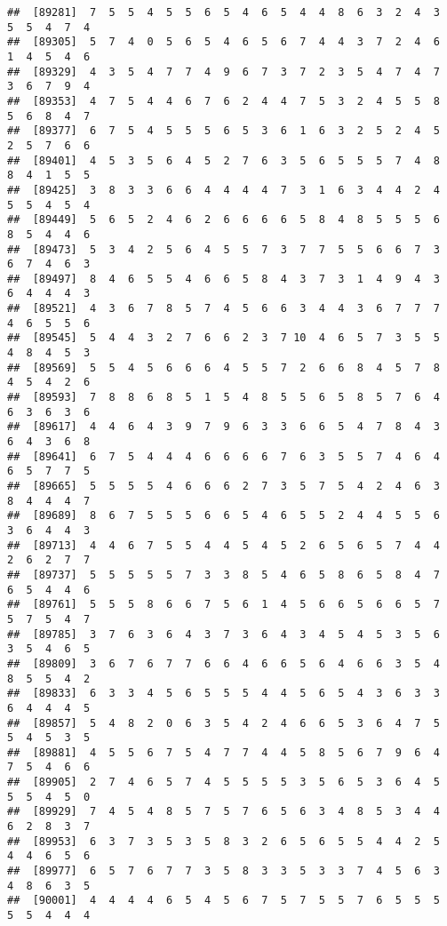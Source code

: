 \documentclass[
]{book}
\begin{document}
\begin{verbatim}
##  [89281]  7  5  5  4  5  5  6  5  4  6  5  4  4  8  6  3  2  4  3  5  5  4  7  4
##  [89305]  5  7  4  0  5  6  5  4  6  5  6  7  4  4  3  7  2  4  6  1  4  5  4  6
##  [89329]  4  3  5  4  7  7  4  9  6  7  3  7  2  3  5  4  7  4  7  3  6  7  9  4
##  [89353]  4  7  5  4  4  6  7  6  2  4  4  7  5  3  2  4  5  5  8  5  6  8  4  7
##  [89377]  6  7  5  4  5  5  5  6  5  3  6  1  6  3  2  5  2  4  5  2  5  7  6  6
##  [89401]  4  5  3  5  6  4  5  2  7  6  3  5  6  5  5  5  7  4  8  8  4  1  5  5
##  [89425]  3  8  3  3  6  6  4  4  4  4  7  3  1  6  3  4  4  2  4  5  5  4  5  4
##  [89449]  5  6  5  2  4  6  2  6  6  6  6  5  8  4  8  5  5  5  6  8  5  4  4  6
##  [89473]  5  3  4  2  5  6  4  5  5  7  3  7  7  5  5  6  6  7  3  6  7  4  6  3
##  [89497]  8  4  6  5  5  4  6  6  5  8  4  3  7  3  1  4  9  4  3  6  4  4  4  3
##  [89521]  4  3  6  7  8  5  7  4  5  6  6  3  4  4  3  6  7  7  7  4  6  5  5  6
##  [89545]  5  4  4  3  2  7  6  6  2  3  7 10  4  6  5  7  3  5  5  4  8  4  5  3
##  [89569]  5  5  4  5  6  6  6  4  5  5  7  2  6  6  8  4  5  7  8  4  5  4  2  6
##  [89593]  7  8  8  6  8  5  1  5  4  8  5  5  6  5  8  5  7  6  4  6  3  6  3  6
##  [89617]  4  4  6  4  3  9  7  9  6  3  3  6  6  5  4  7  8  4  3  6  4  3  6  8
##  [89641]  6  7  5  4  4  4  6  6  6  6  7  6  3  5  5  7  4  6  4  6  5  7  7  5
##  [89665]  5  5  5  5  4  6  6  6  2  7  3  5  7  5  4  2  4  6  3  8  4  4  4  7
##  [89689]  8  6  7  5  5  5  6  6  5  4  6  5  5  2  4  4  5  5  6  3  6  4  4  3
##  [89713]  4  4  6  7  5  5  4  4  5  4  5  2  6  5  6  5  7  4  4  2  6  2  7  7
##  [89737]  5  5  5  5  5  7  3  3  8  5  4  6  5  8  6  5  8  4  7  6  5  4  4  6
##  [89761]  5  5  5  8  6  6  7  5  6  1  4  5  6  6  5  6  6  5  7  5  7  5  4  7
##  [89785]  3  7  6  3  6  4  3  7  3  6  4  3  4  5  4  5  3  5  6  3  5  4  6  5
##  [89809]  3  6  7  6  7  7  6  6  4  6  6  5  6  4  6  6  3  5  4  8  5  5  4  2
##  [89833]  6  3  3  4  5  6  5  5  5  4  4  5  6  5  4  3  6  3  3  6  4  4  4  5
##  [89857]  5  4  8  2  0  6  3  5  4  2  4  6  6  5  3  6  4  7  5  5  4  5  3  5
##  [89881]  4  5  5  6  7  5  4  7  7  4  4  5  8  5  6  7  9  6  4  7  5  4  6  6
##  [89905]  2  7  4  6  5  7  4  5  5  5  5  3  5  6  5  3  6  4  5  5  5  4  5  0
##  [89929]  7  4  5  4  8  5  7  5  7  6  5  6  3  4  8  5  3  4  4  6  2  8  3  7
##  [89953]  6  3  7  3  5  3  5  8  3  2  6  5  6  5  5  4  4  2  5  4  4  6  5  6
##  [89977]  6  5  7  6  7  7  3  5  8  3  3  5  3  3  7  4  5  6  3  4  8  6  3  5
##  [90001]  4  4  4  4  6  5  4  5  6  7  5  7  5  5  7  6  5  5  5  5  5  4  4  4

\end{verbatim}
\end{document}
